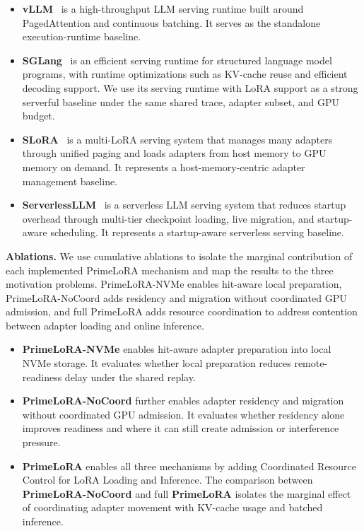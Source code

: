 \documentclass[lettersize,journal]{IEEEtran}
\begin{document}
\begin{itemize}
    \item \textbf{vLLM}~\cite{vLLM} is a high-throughput LLM serving runtime built around PagedAttention and continuous batching. It serves as the standalone execution-runtime baseline.
    \item \textbf{SGLang}~\cite{SGLang} is an efficient serving runtime for structured language model programs, with runtime optimizations such as KV-cache reuse and efficient decoding support. We use its serving runtime with LoRA support as a strong serverful baseline under the same shared trace, adapter subset, and GPU budget.
    \item \textbf{SLoRA}~\cite{SLoRA} is a multi-LoRA serving system that manages many adapters through unified paging and loads adapters from host memory to GPU memory on demand. It represents a host-memory-centric adapter management baseline.
    \item \textbf{ServerlessLLM}~\cite{ServerlessLLM} is a serverless LLM serving system that reduces startup overhead through multi-tier checkpoint loading, live migration, and startup-aware scheduling. It represents a startup-aware serverless serving baseline.
\end{itemize}

\textbf{Ablations.}
We use cumulative ablations to isolate the marginal contribution of each implemented PrimeLoRA mechanism and map the results to the three motivation problems. PrimeLoRA-NVMe enables hit-aware local preparation, PrimeLoRA-NoCoord adds residency and migration without coordinated GPU admission, and full PrimeLoRA adds resource coordination to address contention between adapter loading and online inference.

\begin{itemize}
    \item \textbf{PrimeLoRA-NVMe} enables hit-aware adapter preparation into local NVMe storage. It evaluates whether local preparation reduces remote-readiness delay under the shared replay.
    \item \textbf{PrimeLoRA-NoCoord} further enables adapter residency and migration without coordinated GPU admission. It evaluates whether residency alone improves readiness and where it can still create admission or interference pressure.
    \item \textbf{PrimeLoRA} enables all three mechanisms by adding Coordinated Resource Control for LoRA Loading and Inference. The comparison between \textbf{PrimeLoRA-NoCoord} and full \textbf{PrimeLoRA} isolates the marginal effect of coordinating adapter movement with KV-cache usage and batched inference.
\end{itemize}
\end{document}

